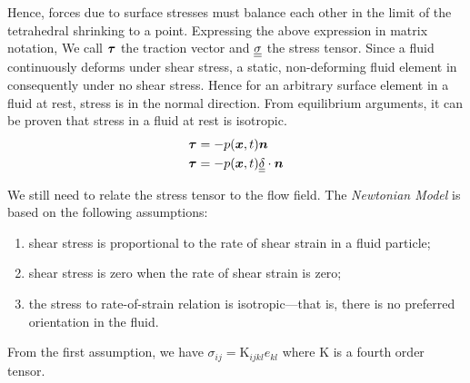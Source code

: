 Hence, forces due to surface stresses must balance each other in the limit of the tetrahedral shrinking to a point. Expressing the above expression in matrix notation,
We call $\boldsymbol{\tau}$ the traction vector and $\underline{\underline{\sigma}}$ the stress tensor.
Since a fluid continuously deforms under shear stress, a static, non-deforming fluid element in consequently under no shear stress. Hence for an arbitrary surface element in a fluid at rest, stress is in the normal direction. From equilibrium arguments, it can be proven that stress in a fluid at rest is isotropic.
\begin{equation}
\begin{split}
    \boldsymbol{\tau} &= -p(\boldsymbol{x},t)\boldsymbol{n} \\
    \boldsymbol{\tau} &= -p(\boldsymbol{x},t)\underline{\underline{\delta}}\cdot\boldsymbol{n}
\end{split}
\end{equation}

We still need to relate the stress tensor to the flow field. The \textit{Newtonian Model} is based on the following assumptions:
\begin{enumerate}
    \item shear stress is proportional to the rate of shear strain in a fluid particle;
    \item shear stress is zero when the rate of shear strain is zero;
    \item the stress to rate-of-strain relation is isotropic—that is, there is no preferred orientation in the fluid.
\end{enumerate}
From the first assumption, we have $\sigma_{ij}=\mathrm{K}_{ijkl}e_{kl}$ where $\mathrm{K}$ is a fourth order tensor.

